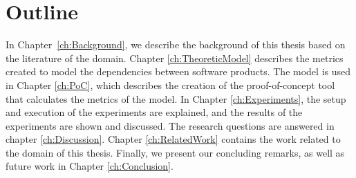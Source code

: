 \section{Outline}
In Chapter~\ref{ch:Background}, we describe the background of this thesis based on the literature of the domain.
Chapter \ref{ch:TheoreticModel} describes the metrics created to model the dependencies between software products.
The model is used in Chapter \ref{ch:PoC}, which describes the creation of the proof-of-concept tool that calculates the metrics of the model.
In Chapter \ref{ch:Experiments}, the setup and execution of the experiments are explained, and the results of the experiments are shown and discussed. The research questions are answered in chapter \ref{ch:Discussion}. Chapter \ref{ch:RelatedWork} contains the work related to the domain of this thesis.
Finally, we present our concluding remarks, as well as future work in Chapter \ref{ch:Conclusion}.
